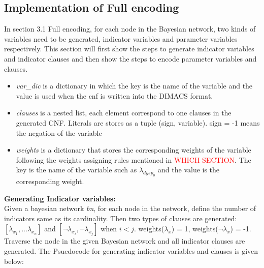    \subsection{Implementation of Full encoding}
    In section 3.1 Full encoding, for each node in the Bayesian network, two kinds of variables need to be generated, indicator variables and parameter variables respectively. This section will first show the steps to generate indicator variables and indicator clauses and then show the steps to encode parameter variables and clauses.
    \begin{itemize}
        \item \textit{var\_dic} is a dictionary in which the key is the name of the variable and the value is used when the cnf is written into the DIMACS format. 
        \item \textit{clauses} is a nested list, each element correspond to one clauses in the generated CNF. Literals are stores as a tuple (sign, variable). sign = -1 means the negation of the variable
        \item \textit{weights} is a dictionary that stores the corresponding weights of the variable following the weights assigning rules mentioned in \textcolor{red}{WHICH SECTION}. The key is the name of the variable such as $\lambda_{dysp_{0}}$ and the value is the corresponding weight.
    \end{itemize}
    \textbf{Generating Indicator variables:}\\
    Given a bayesian network \textit{bn}, for each node in the network, define the number of indicators same as its cardinality. Then two types of clauses are generated: $[\lambda_{x_{1}}, ... \lambda_{x_{n}}]$ and $[\neg \lambda_{x_{i}}, \neg \lambda_{x_{j}}]$ when $i < j$. weights($\lambda_{x}$) = 1, weights($\neg \lambda_{x}$) = -1. Traverse the node in the given Bayesian network and all indicator clauses are generated.
    The Psuedocode for generating indicator variables and clauses is given below:
